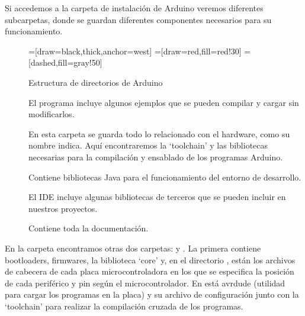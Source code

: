 Si accedemos a la carpeta de instalación de Arduino veremos diferentes subcarpetas, donde se guardan diferentes componentes necesarios para su funcionamiento.
\begin{figure}[H]
\begin{center}
=[draw=black,thick,anchor=west]
=[draw=red,fill=red!30]
=[dashed,fill=gray!50]
\end{center}
\caption{Estructura de directorios de Arduino}
\label{arduino_carpetas}
\end{figure}

\begin{description}
	\item[] El programa incluye algunos ejemplos que se pueden compilar y cargar sin modificarlos.
	\item[] En esta carpeta se guarda todo lo relacionado con el hardware, como su nombre indica. Aquí encontraremos la `toolchain' y las bibliotecas necesarias para la compilación y ensablado de los programas Arduino.
	\item[] Contiene bibliotecas Java para el funcionamiento del entorno de desarrollo.
		\item[] El IDE incluye algunas bibliotecas de terceros que se pueden incluir en nuestros proyectos.
		\item[] Contiene toda la documentación.
\end{description}

En la carpeta  encontramos otras dos carpetas:  y .  La primera contiene bootloaders, firmwares, la biblioteca `core' y, en el directorio , están los archivos de cabecera de cada placa microcontroladora en los que se especifica la posición de cada periférico y pin según el microcontrolador.  En  está avrdude (utilidad para cargar los programas en la placa) y su archivo de configuración junto con la `toolchain'  para realizar la compilación cruzada de los programas.

